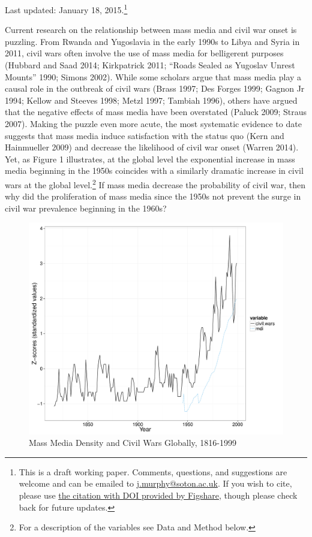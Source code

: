 \documentclass[11pt,article,oneside]{memoir}
\makeatletter
\def\maxwidth{\ifdim\Gin@nat@width>\linewidth\linewidth
\else\Gin@nat@width\fi}
\let\Oldincludegraphics\includegraphics
\renewcommand{\includegraphics}[1]{\Oldincludegraphics[width=\maxwidth]{#1}}
\makeatother
\begin{document}
Last updated: January 18, 2015.\footnote{This is a draft working paper.
  Comments, questions, and suggestions are welcome and can be emailed to
  \href{mailto:j.murphy@soton.ac.uk}{j.murphy@soton.ac.uk}. If you wish
  to cite, please use
  \href{http://figshare.com/authors/Justin_Murphy/498998}{the citation
  with DOI provided by Figshare}, though please check back for future
  updates.} \newline

\clearpage
{}

\onehalfspacing

Current research on the relationship between mass media and civil war
onset is puzzling. From Rwanda and Yugoslavia in the early 1990s to
Libya and Syria in 2011, civil wars often involve the use of mass media
for belligerent purposes (Hubbard and Saad 2014; Kirkpatrick 2011;
``Roads Sealed as Yugoslav Unrest Mounts'' 1990; Simons 2002). While
some scholars argue that mass media play a causal role in the outbreak
of civil wars (Brass 1997; Des Forges 1999; Gagnon Jr 1994; Kellow and
Steeves 1998; Metzl 1997; Tambiah 1996), others have argued that the
negative effects of mass media have been overstated (Paluck 2009; Straus
2007). Making the puzzle even more acute, the most systematic evidence
to date suggests that mass media induce satisfaction with the status quo
(Kern and Hainmueller 2009) and decrease the likelihood of civil war
onset (Warren 2014). Yet, as Figure 1 illustrates, at the global level
the exponential increase in mass media beginning in the 1950s coincides
with a similarly dramatic increase in civil wars at the global
level.\footnote{For a description of the variables see Data and Method
  below.} If mass media decrease the probability of civil war, then why
did the proliferation of mass media since the 1950s not prevent the
surge in civil war prevalence beginning in the 1960s?

\begin{figure}[htbp]
\centering
\includegraphics{media_civil_war_files/figure-markdown/globalplot.pdf}
\caption{Mass Media Density and Civil Wars Globally, 1816-1999}
\end{figure}
\end{document}
